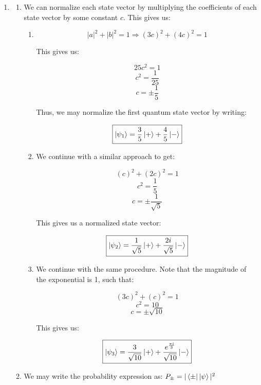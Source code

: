 \begin{enumerate}

  \item 

    \begin{enumerate}

      \item We can normalize each state vector by multiplying the coefficients of each state vector by some constant $c$. This gives us:

        \begin{enumerate}

          \item 

            $$|a|^2+|b|^2=1\Longrightarrow (3c)^2+(4c)^2=1$$

            This gives us:

            $$25c^2=1$$
            $$c^2=\frac{1}{25}$$
            $$c=\pm \frac{1}{5}$$

            Thus, we may normalize the first quantum state vector by writing:

            $$\boxed{\ket{\psi_1}=\frac{3}{5}\ket{+}+\frac{4}{5}\ket{-}}$$

          \item We continue with a similar approach to get:

            $$(c)^2+(2c)^2=1$$
            $$c^2=\frac{1}{5}$$
            $$c=\pm\frac{1}{\sqrt{5}}$$

            This gives us a normalized state vector:

            $$\boxed{\ket{\psi_2}=\frac{1}{\sqrt{5}}\ket{+}+\frac{2i}{\sqrt{5}}\ket{-}}$$

          \item We continue with the same procedure. Note that the magnitude of the exponential is 1, such that:

            $$(3c)^2+(c)^2=1$$
            $$c^2=10$$
            $$c=\pm\sqrt{10}$$

            This gives us:

            $$\boxed{\ket{\psi_3}=\frac{3}{\sqrt{10}}\ket{+}+\frac{e^{\frac{\pi i}{3}}}{\sqrt{10}}\ket{-}}$$

        \end{enumerate}

      \item We may write the probability expression as: $P_{\pm}=|\bra{\pm}{\ket{\psi}}|^2$

        \begin{enumerate}


\end{enumerate}
\end{enumerate}
\end{enumerate}
